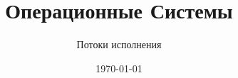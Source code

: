 \documentclass[handout,12pt]{beamer}
\title{Операционные Системы}
\subtitle{Потоки исполнения}
\date{\today}
\begin{document}
  \begin{frame}
    \titlepage
  \end{frame}
  
  
  
\end{document}
